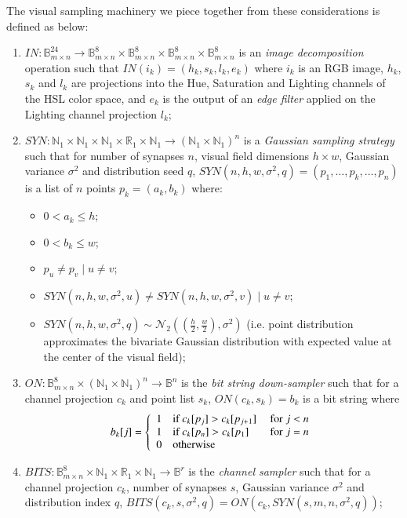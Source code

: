 \documentclass[twocolumn, 9pt]{jsproceedings}
\begin{document}
The visual sampling machinery we piece together from these considerations is defined as below:

\begin{enumerate}
\item \(IN : \mathbb{B}^{24}_{m \times n} \to \mathbb{B}^{8}_{m \times n} \times \mathbb{B}^{8}_{m \times n} \times \mathbb{B}^{8}_{m \times n} \times \mathbb{B}^{8}_{m \times n} \) is an {\it image decomposition} operation such that \(IN(i_k) = (h_k, s_k, l_k, e_k)\) where \(i_k\) is an RGB image, \(h_k\), \(s_k\) and \(l_k\) are projections into the Hue, Saturation and Lighting channels of the HSL color space, and \(e_k\) is the output of an {\it edge filter} applied on the Lighting channel projection \(l_k\);
\item \(SYN : \mathbb{N}_1 \times \mathbb{N}_1 \times \mathbb{N}_1 \times \mathbb{R}_1 \times \mathbb{N}_1 \to (\mathbb{N}_1 \times \mathbb{N}_1)^n\) is a {\it Gaussian sampling strategy} such that for number of synapses \(n\), visual field dimensions \(h \times w\), Gaussian variance \(\sigma^2\) and distribution seed \(q\), \(SYN(n, h, w, \sigma^2, q) = (p_1, \dotsc , p_k, \dotsc , p_n)\) is a list of \(n\) points \(p_k = (a_k, b_k)\) where:
\begin{itemize}
\item \(0 < a_k \leq h\);
\item \(0 < b_k \leq w\);
\item \(p_u \neq p_v \; | \; u \neq v\);
\item \(SYN(n, h, w, \sigma^2, u) \neq SYN(n, h, w, \sigma^2, v) \; | \; u \neq v\);
\item \(SYN(n, h, w, \sigma^2, q) \sim \mathcal{N}_2((\frac{h}{2},\frac{w}{2}), \sigma^2)\) (i.e. point distribution approximates the bivariate Gaussian distribution with expected value at the center of the visual field);
\end{itemize}
\item \(ON : \mathbb{B}^{8}_{m \times n} \times (\mathbb{N}_1 \times \mathbb{N}_1)^n \to \mathbb{B}^n \) is the {\it bit string down-sampler} such that for a channel projection \(c_k\) and point list \(s_k\), \(ON(c_k, s_k) = b_k\) is a bit string where
\begin{equation*}
b_k[j] = \left\{
\begin{array}{l l l}
1 & \text{if } c_k[p_j] > c_k[p_{j+1}] & \text{ for } j < n\\
1 & \text{if } c_k[p_n] > c_k[p_1] & \text{ for } j = n\\
0 & \text{otherwise} &
\end{array}
\right.
\end{equation*}
\item \(BITS : \mathbb{B}^{8}_{m \times n} \times \mathbb{N}_1 \times \mathbb{R}_1 \times \mathbb{N}_1 \to \mathbb{B}^r\) is the {\it channel sampler} such that for a channel projection \(c_k\), number of synapses \(s\), Gaussian variance \(\sigma^2\) and distribution index \(q\), \(BITS(c_k, s, \sigma^2, q) = ON(c_k, SYN(s, m, n, \sigma^2, q))\);
\end{enumerate}
\end{document}
